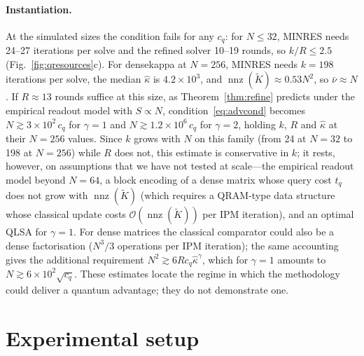 \documentclass[11pt]{article}
\theoremstyle{definition}
\newcommand{\Kt}{\tilde K}
\newcommand{\kh}{\hat\kappa}
\newcommand{\bigO}{\mathcal{O}}
\newcommand{\nnz}{\operatorname{nnz}}
\newcommand{\dsus}{\textunderscore\penalty5000\hskip0pt\relax}
\newcommand{\ds}[1]{{\ttfamily\let\_\dsus#1}}
\begin{document}
\paragraph{Instantiation.} At the simulated sizes the condition fails for any $c_q$: for $N\le32$, MINRES needs 24--27 iterations per solve and the refined solver 10--19 rounds, so $k/R\le2.5$ (Fig.~\ref{fig:qresources}c). For \ds{dense\_kappa} at $N=256$, MINRES needs $k=198$ iterations per solve, the median $\kh$ is $4.2\times10^{3}$, and $\nnz(\Kt)\approx0.53N^2$, so $\bar\nu\approx N$. If $R\approx13$ rounds suffice at this size, as Theorem~\ref{thm:refine} predicts under the empirical readout model with $S\propto N$, condition~\eqref{eq:advcond} becomes $N\gtrsim3\times10^{2}\,c_q$ for $\gamma=1$ and $N\gtrsim1.2\times10^{6}\,c_q$ for $\gamma=2$, holding $k$, $R$ and $\kh$ at their $N=256$ values. Since $k$ grows with $N$ on this family (from 24 at $N=32$ to 198 at $N=256$) while $R$ does not, this estimate is conservative in $k$; it rests, however, on assumptions that we have not tested at scale---the empirical readout model beyond $N=64$, a block encoding of a dense matrix whose query cost $t_q$ does not grow with $\nnz(\Kt)$ (which requires a QRAM-type data structure whose classical update costs $\bigO(\nnz(\Kt))$ per IPM iteration), and an optimal QLSA for $\gamma=1$. For dense matrices the classical comparator could also be a dense factorisation ($N^3/3$ operations per IPM iteration); the same accounting gives the additional requirement $N^2\gtrsim6Rc_q\kh^{\gamma}$, which for $\gamma=1$ amounts to $N\gtrsim6\times10^{2}\sqrt{c_q}$. These estimates locate the regime in which the methodology could deliver a quantum advantage; they do not demonstrate one.

\section{Experimental setup}\label{sec:setup}\label{sec:design}
\end{document}
